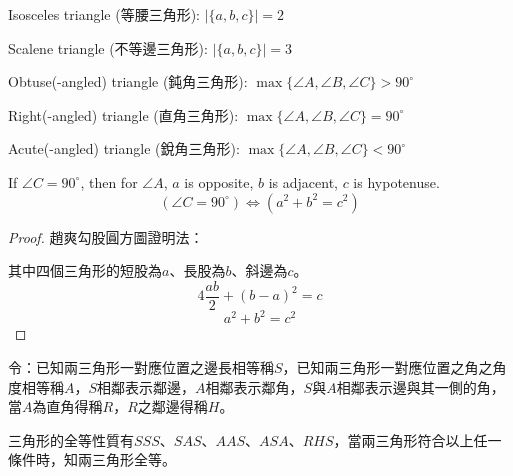 \documentclass[a4paper,12pt]{report}
\begin{document}
\item Isosceles triangle (等腰三角形): $|\{a,b,c\}|=2$
\item Scalene triangle (不等邊三角形): $|\{a,b,c\}|=3$
\item Obtuse(-angled) triangle (鈍角三角形): $\max\{\angle A,\angle B,\angle C\}>90^\circ$
\item Right(-angled) triangle (直角三角形): $\max\{\angle A,\angle B,\angle C\}=90^\circ$
\item Acute(-angled) triangle (銳角三角形): $\max\{\angle A,\angle B,\angle C\}<90^\circ$
\item 
\eit
{}
If $\angle C=90^\circ$, then for $\angle A$, $a$ is opposite, $b$ is adjacent, $c$ is hypotenuse.
\[(\angle C=90^\circ)\iff (a^2+b^2=c^2)\]
\begin{proof}
趙爽勾股圓方圖證明法：
\begin{center}
\end{center}
其中四個三角形的短股為$a$、長股為$b$、斜邊為$c$。
\[4\frac{ab}{2}+(b-a)^2=c\]
\[a^2+b^2=c^2\]
\end{proof}
令：已知兩三角形一對應位置之邊長相等稱$S$，已知兩三角形一對應位置之角之角度相等稱$A$，$S$相鄰表示鄰邊，$A$相鄰表示鄰角，$S$與$A$相鄰表示邊與其一側的角，當$A$為直角得稱$R$，$R$之鄰邊得稱$H$。

三角形的全等性質有$SSS$、$SAS$、$AAS$、$ASA$、$RHS$，當兩三角形符合以上任一條件時，知兩三角形全等。
\end{document}
